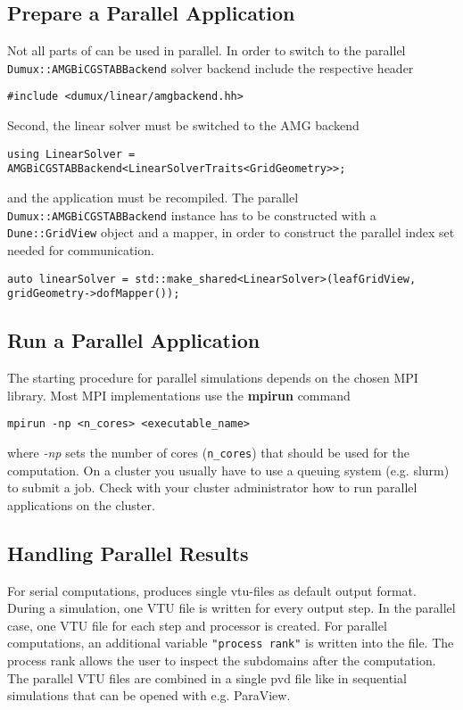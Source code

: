 \subsection{Prepare a Parallel Application}
Not all parts of \Dumux can be used in parallel. In order to switch to the parallel \texttt{Dumux::AMGBiCGSTABBackend}
solver backend include the respective header

\begin{lstlisting}[style=DumuxCode]
#include <dumux/linear/amgbackend.hh>
\end{lstlisting}

Second, the linear solver must be switched to the AMG backend

\begin{lstlisting}[style=DumuxCode]
using LinearSolver = AMGBiCGSTABBackend<LinearSolverTraits<GridGeometry>>;
\end{lstlisting}

and the application must be recompiled. The parallel \texttt{Dumux::AMGBiCGSTABBackend} instance has to be
constructed with a \texttt{Dune::GridView} object and a mapper, in order to construct the
parallel index set needed for communication.

\begin{lstlisting}[style=DumuxCode]
auto linearSolver = std::make_shared<LinearSolver>(leafGridView, gridGeometry->dofMapper());
\end{lstlisting}

\subsection{Run a Parallel Application}
The starting procedure for parallel simulations depends on the chosen MPI library.
Most MPI implementations use the \textbf{mpirun} command

\begin{lstlisting}[style=Bash]
mpirun -np <n_cores> <executable_name>
\end{lstlisting}

where \textit{-np} sets the number of cores (\texttt{n\_cores}) that should be used for the
computation. On a cluster you usually have to use a queuing system (e.g. slurm) to
submit a job. Check with your cluster administrator how to run parallel applications on the cluster.

\subsection{Handling Parallel Results}
For serial computations, \Dumux produces single vtu-files as default output format.
During a simulation, one VTU file is written for every output step.
In the parallel case, one VTU file for each step and processor is created.
For parallel computations, an additional variable \texttt{"process rank"} is written
into the file. The process rank allows the user to inspect the subdomains
after the computation. The parallel VTU files are combined in a single pvd file
like in sequential simulations that can be opened with e.g. ParaView.

